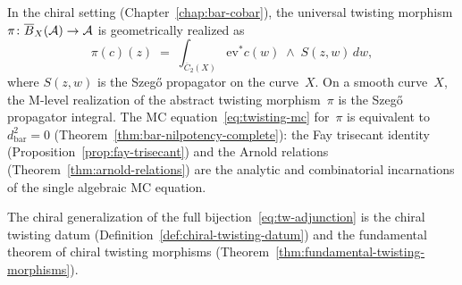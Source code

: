 \begin{remark}
\label{rem:twisting-as-propagator}
In the chiral setting (Chapter~\ref{chap:bar-cobar}), the universal
twisting morphism $\pi\colon \overline{B}_X(\mathcal{A}) \to \mathcal{A}$ is geometrically
realized as
\begin{equation}\label{eq:twisting-propagator}
\pi(c)(z)
\;=\;
\int_{\overline{C}_2(X)}
\mathrm{ev}^* c(w) \;\wedge\; S(z, w)\, dw,
\end{equation}
where $S(z,w)$ is the Szeg\H{o} propagator on the curve~$X$.
On a smooth curve~$X$, the M-level realization of the abstract
twisting morphism~$\pi$ is the Szeg\H{o} propagator integral.
The MC equation~\eqref{eq:twisting-mc} for~$\pi$ is equivalent to
$d_{\mathrm{bar}}^2 = 0$
(Theorem~\ref{thm:bar-nilpotency-complete}): the Fay trisecant
identity (Proposition~\ref{prop:fay-trisecant}) and the Arnold
relations (Theorem~\ref{thm:arnold-relations}) are the analytic
and combinatorial incarnations of the single algebraic MC equation.

The chiral generalization of the full bijection~\eqref{eq:tw-adjunction}
is the chiral twisting datum
(Definition~\ref{def:chiral-twisting-datum}) and the fundamental
theorem of chiral twisting morphisms
(Theorem~\ref{thm:fundamental-twisting-morphisms}).
\end{remark}

